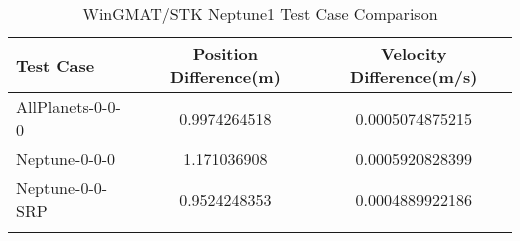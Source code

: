 \begin{table}[htbp!]
\centering
\caption{ WinGMAT/STK Neptune1 Test Case Comparison}
      \begin{tabular}{lcc}
      \hline\hline
          Test Case & Position Difference(m) & Velocity Difference(m/s) \\
         \hline
         AllPlanets-0-0-0 & 0.9974264518 & 0.0005074875215 \\
         Neptune-0-0-0 & 1.171036908 & 0.0005920828399 \\
         Neptune-0-0-SRP & 0.9524248353 & 0.0004889922186 \\
      \hline\hline
      \label{Table: Neptune1 WinGMAT-STK Table} 
\end{tabular}
\end{table}

